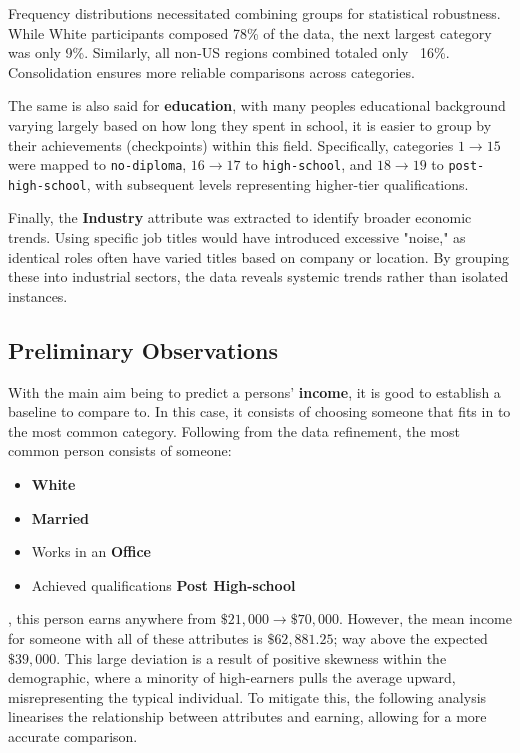 Frequency distributions necessitated combining groups for statistical robustness. While White participants composed 78\% of the data, the next
largest category was only 9\%. Similarly, all non-US regions combined totaled only ~16\%. Consolidation ensures more reliable comparisons
across categories.

The same is also said for \textbf{education}, with many peoples educational background varying largely based on how long they spent in
school, it is easier to group by their achievements (checkpoints) within this field. Specifically, categories $1 \to 15$ were mapped to
\texttt{no-diploma}, $16 \to 17$ to \texttt{high-school}, and $18 \to 19$ to \texttt{post-high-school}, with subsequent levels representing
higher-tier qualifications.

Finally, the \textbf{Industry} attribute was extracted to identify broader economic trends. Using specific job titles would have
introduced excessive "noise," as identical roles often have varied titles based on company or location. By grouping these into industrial
sectors, the data reveals systemic trends rather than isolated instances.

\subsection{Preliminary Observations}
With the main aim being to predict a persons' \textbf{income}, it is good to establish a baseline to compare to. In this case, it consists
of choosing someone that fits in to the most common category. Following from the data refinement, the most common person consists of
someone:
\begin{itemize}
    \item \textbf{White}
    \item \textbf{Married}
    \item Works in an \textbf{Office}
    \item Achieved qualifications \textbf{Post High-school}
\end{itemize}
, this person earns anywhere from $\$21,000\to\$70,000$. However, the mean income for someone with all of these attributes is
$\$62,881.25$; way above the expected $\$39,000$. This large deviation is a result of positive skewness within the demographic,
where a minority of high-earners pulls the average upward, misrepresenting the typical individual. To
mitigate this, the following analysis linearises the relationship between attributes and earning, allowing for a more accurate
comparison.